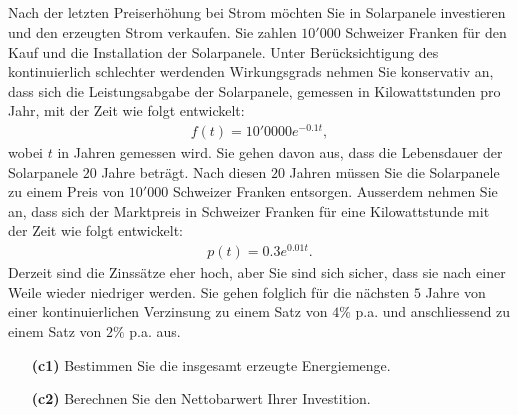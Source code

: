 \subsection*{}
Nach der letzten Preiserhöhung bei Strom möchten Sie in Solarpanele investieren und den erzeugten Strom verkaufen. 
Sie zahlen $10'000$ Schweizer Franken für den Kauf und die
Installation der Solarpanele.
Unter Berücksichtigung des kontinuierlich schlechter werdenden Wirkungsgrads nehmen Sie konservativ an, dass sich die Leistungsabgabe der Solarpanele, gemessen in Kilowattstunden pro Jahr, mit der Zeit wie folgt entwickelt:
\begin{align*}
	f(t) = 10'0000 e^{-0.1 t},
\end{align*}
wobei $t$ in Jahren gemessen wird.
Sie gehen davon aus, dass die Lebensdauer der Solarpanele $20$ Jahre beträgt. Nach diesen $20$ Jahren müssen Sie die Solarpanele zu einem Preis von $10'000$ Schweizer Franken entsorgen. Ausserdem nehmen Sie an, dass sich der Marktpreis in
Schweizer Franken für eine Kilowattstunde mit der Zeit wie folgt entwickelt:
\begin{align*}
	p(t)
	=
	0.3 e^{0.01t}.
\end{align*}
Derzeit sind die Zinssätze eher hoch, aber Sie sind sich sicher, dass sie nach einer Weile wieder niedriger werden. Sie gehen folglich für die nächsten $5$ Jahre von einer kontinuierlichen
Verzinsung zu einem Satz von $4 \%$ p.a. und anschliessend zu einem Satz von $2\%$ p.a. aus.

\begin{enumerate}
	\item[\textbf{(c1)}] 
	Bestimmen Sie die insgesamt erzeugte Energiemenge.
	\item[\textbf{(c2)}]
	Berechnen Sie den Nettobarwert Ihrer Investition.
\end{enumerate}

\newpage


